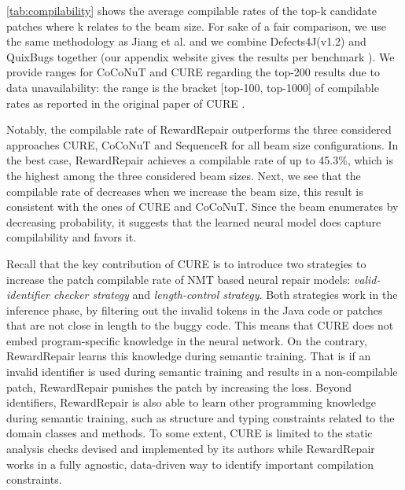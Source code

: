 \autoref{tab:compilability} shows the average compilable rates of the top-k candidate patches where k relates to the beam size. For sake of a fair comparison, we use  the same methodology as Jiang et al. \cite{CURE-icse21} and we combine Defects4J(v1.2) and QuixBugs together (our appendix website gives the results per benchmark \cite{experiment}). 
We provide ranges for CoCoNuT and CURE regarding the top-200 results due to data unavailability:
the range is the bracket [top-100,  top-1000] of compilable rates as reported in the original paper of CURE \cite{CURE-icse21}.

Notably,  the compilable rate of RewardRepair outperforms the three considered approaches CURE, CoCoNuT and SequenceR for all beam size configurations.
In the best case, RewardRepair achieves a compilable rate of up to 45.3\%, which is the highest among the three considered beam sizes. 
Next, we see that the compilable rate of \approach decreases when we increase the beam size,  this result is consistent with the ones of CURE and CoCoNuT. Since the beam enumerates by decreasing probability, it suggests that the learned neural model does capture compilability and favors it. 

Recall that the key contribution of CURE \cite{CURE-icse21} is to introduce  two strategies to increase the patch compilable rate of NMT based neural repair models: \textit{valid-identifier checker strategy} and \textit{length-control strategy}.
Both strategies work in the inference phase, by filtering out the invalid tokens in the Java code or patches that are not
close in length to the buggy code.
This means that CURE does not embed program-specific knowledge in the neural network. 
On the contrary, RewardRepair learns this knowledge during semantic training.  That is if an invalid identifier is used during semantic training  and results in a non-compilable patch, RewardRepair punishes the patch by increasing the loss. 
Beyond identifiers, RewardRepair is also able to learn other programming knowledge during semantic training, such as structure and typing constraints related to the domain classes and methods.
To some extent, CURE is limited to the static analysis checks devised and implemented by its authors while RewardRepair works in a fully agnostic, data-driven way to identify important compilation constraints.


